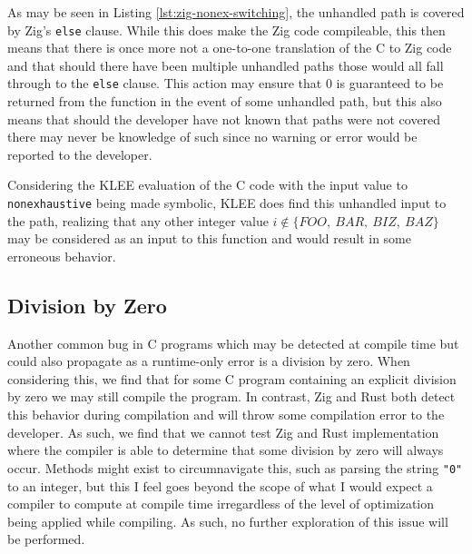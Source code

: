\documentclass[conference]{IEEEtran}
\newenvironment{code}{\captionsetup{type=listing}}{}
\begin{document}
\begin{code}
    \medskip
    \inputminted[firstline=64,lastline=78]{zig}{../code-examples/zig-translations/nonexhaustive-switching.zig}
    \label{lst:zig-nonex-switching}
    \medskip
\end{code}

As may be seen in Listing \ref{lst:zig-nonex-switching}, the unhandled path is covered by Zig's
\texttt{else} clause. While this does make the Zig code compileable, this then means that there
is once more not a one-to-one translation of the C to Zig code and that should there have been
multiple unhandled paths those would all fall through to the \texttt{else} clause. This action
may ensure that 0 is guaranteed to be returned from the function in the event of some unhandled
path, but this also means that should the developer have not known that paths were not covered
there may never be knowledge of such since no warning or error would be reported to the
developer.

Considering the KLEE evaluation of the C code with the input value to \texttt{nonexhaustive}
being made symbolic, KLEE does find this unhandled input to the path, realizing that any other
integer value $i\notin\{FOO,\ BAR,\ BIZ,\ BAZ\}$ may be considered as an input to this function
and would result in some erroneous behavior.


\subsection{Division by Zero}
Another common bug in C programs which may be detected at compile time but could also propagate
as a runtime-only error is a division by zero. When considering this, we find that for some C
program containing an explicit division by zero we may still compile the program. In contrast,
Zig and Rust both detect this behavior during compilation and will throw some compilation error
to the developer. As such, we find that we cannot test Zig and Rust implementation where the
compiler is able to determine that some division by zero will always occur. Methods might exist
to circumnavigate this, such as parsing the string \texttt{"0"} to an integer, but this I feel
goes beyond the scope of what I would expect a compiler to compute at compile time irregardless
of the level of optimization being applied while compiling. As such, no further exploration of
this issue will be performed.
\end{document}
